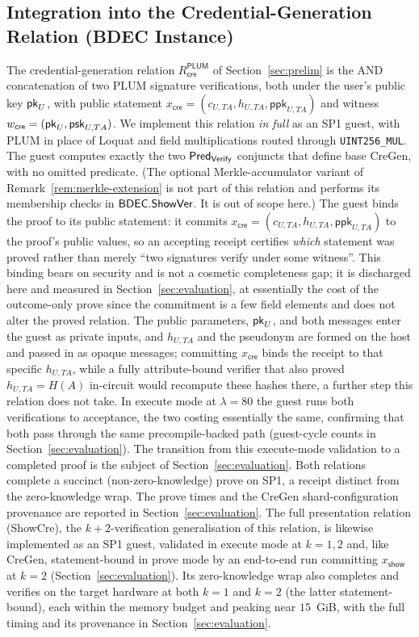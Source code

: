\subsection{Integration into the Credential-Generation Relation (BDEC Instance)}\label{ssec:integration}
The credential-generation relation $R_{\mathsf{cre}}^{\mathsf{PLUM}}$ of Section~\ref{sec:prelim} is the AND concatenation of two PLUM signature verifications, both under the user's public key $\mathsf{pk}_U$, with public statement $x_{\mathsf{cre}}=(c_{U,TA},h_{U,TA},\mathsf{ppk}_{U,TA})$ and witness $w_{\mathsf{cre}}=(\mathsf{pk}_U,\mathsf{psk}_{U,TA})$. We implement this relation \emph{in full} as an SP1 guest, with PLUM in place of Loquat and field multiplications routed through \texttt{UINT256\_MUL}. The guest computes exactly the two $\mathsf{Pred}_{\mathsf{Verify}}$ conjuncts that define base CreGen, with no omitted predicate. (The optional Merkle-accumulator variant of Remark~\ref{rem:merkle-extension} is not part of this relation and performs its membership checks in $\mathsf{BDEC}.\mathsf{ShowVer}$. It is out of scope here.) The guest binds the proof to its public statement: it commits $x_{\mathsf{cre}}=(c_{U,TA},h_{U,TA},\mathsf{ppk}_{U,TA})$ to the proof's public values, so an accepting receipt certifies \emph{which} statement was proved rather than merely ``two signatures verify under some witness''. This binding bears on security and is not a cosmetic completeness gap; it is discharged here and measured in Section~\ref{sec:evaluation}, at essentially the cost of the outcome-only prove since the commitment is a few field elements and does not alter the proved relation. The public parameters, $\mathsf{pk}_U$, and both messages enter the guest as private inputs, and $h_{U,TA}$ and the pseudonym are formed on the host and passed in as opaque messages; committing $x_{\mathsf{cre}}$ binds the receipt to that specific $h_{U,TA}$, while a fully attribute-bound verifier that also proved $h_{U,TA}=H(A)$ in-circuit would recompute these hashes there, a further step this relation does not take. In execute mode at $\lambda=80$ the guest runs both verifications to acceptance, the two costing essentially the same, confirming that both pass through the same precompile-backed path (guest-cycle counts in Section~\ref{sec:evaluation}). The transition from this execute-mode validation to a completed proof is the subject of Section~\ref{sec:evaluation}. Both relations complete a succinct (non-zero-knowledge) prove on SP1, a receipt distinct from the zero-knowledge wrap. The prove times and the CreGen shard-configuration provenance are reported in Section~\ref{sec:evaluation}. The full presentation relation (ShowCre), the $k+2$-verification generalisation of this relation, is likewise implemented as an SP1 guest, validated in execute mode at $k=1,2$ and, like CreGen, statement-bound in prove mode by an end-to-end run committing $x_{\mathsf{show}}$ at $k=2$ (Section~\ref{sec:evaluation}). Its zero-knowledge wrap also completes and verifies on the target hardware at both $k=1$ and $k=2$ (the latter statement-bound), each within the memory budget and peaking near $15$~GiB, with the full timing and its provenance in Section~\ref{sec:evaluation}.

